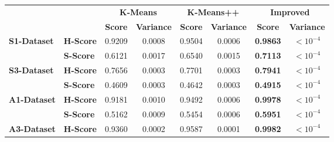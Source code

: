 \documentclass[10pt,twocolumn,letterpaper]{article}
\begin{document}
\begin{table}
    \centering
    \begin{tabular}{ll c c c c c c}
        \toprule
                                             &                  & \multicolumn{2}{c}{\textbf{K-Means}} & \multicolumn{2}{c}{\textbf{K-Means++}} & \multicolumn{2}{c}{\textbf{Improved}}                                                             \\
        \cmidrule(lr){3-4} \cmidrule(lr){5-6} \cmidrule(lr){7-8}
                                             &                  & \textbf{Score}                       & \textbf{Variance}                      & \textbf{Score}                        & \textbf{Variance} & \textbf{Score}  & \textbf{Variance}   \\
        \midrule
        \multirow{2}{*}{\textbf{S1-Dataset}} & \textbf{H-Score} & 0.9209                               & 0.0008                                 & 0.9504                                & 0.0006            & \textbf{0.9863} & \textbf{$<10^{-4}$} \\
                                             & \textbf{S-Score} & 0.6121                               & 0.0017                                 & 0.6540                                & 0.0015            & \textbf{0.7113} & \textbf{$<10^{-4}$} \\
        \midrule
        \multirow{2}{*}{\textbf{S3-Dataset}} & \textbf{H-Score} & 0.7656                               & 0.0003                                 & 0.7701                                & 0.0003            & \textbf{0.7941} & \textbf{$<10^{-4}$} \\
                                             & \textbf{S-Score} & 0.4609                               & 0.0003                                 & 0.4642                                & 0.0003            & \textbf{0.4915} & \textbf{$<10^{-4}$} \\
        \midrule
        \multirow{2}{*}{\textbf{A1-Dataset}} & \textbf{H-Score} & 0.9181                               & 0.0010                                 & 0.9492                                & 0.0006            & \textbf{0.9978} & \textbf{$<10^{-4}$} \\
                                             & \textbf{S-Score} & 0.5162                               & 0.0009                                 & 0.5454                                & 0.0006            & \textbf{0.5951} & \textbf{$<10^{-4}$} \\
        \midrule
        \multirow{2}{*}{\textbf{A3-Dataset}} & \textbf{H-Score} & 0.9360                               & 0.0002                                 & 0.9587                                & 0.0001            & \textbf{0.9982} & \textbf{$<10^{-4}$} \\

\end{tabular}
\end{table}
\end{document}
